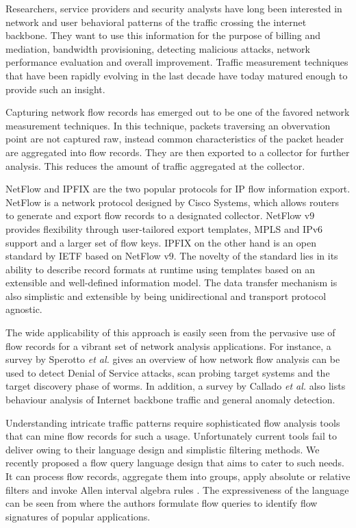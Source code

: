 Researchers, service providers and security analysts have long been interested
in network and user behavioral patterns of the traffic crossing the internet
backbone. They want to use this information for the purpose of billing and
mediation, bandwidth provisioning, detecting malicious attacks, network
performance evaluation and overall improvement. Traffic measurement techniques
that have been rapidly evolving in the last decade have today matured enough
to provide such an insight.

Capturing network flow records has emerged out to be one of the favored
network measurement techniques. In this technique, packets traversing an
obvervation point are not captured raw, instead common characteristics of the
packet header are aggregated into flow records. They are then exported to a
collector for further analysis.  This reduces the amount of traffic aggregated
at the collector.

NetFlow and \ac{IPFIX} are the two popular protocols for IP flow information
export. NetFlow \cite{rfc3954} is a network protocol designed by Cisco
Systems, which allows routers to generate and export flow records to a
designated collector. NetFlow v$9$ provides flexibility through user-tailored
export templates, \ac{MPLS} and IPv$6$ support and a larger set of flow keys.
\ac{IPFIX} \cite{rfc5101} on the other hand is an open standard by IETF based
on NetFlow v$9$. The novelty of the standard lies in its ability to describe
record formats at runtime using templates based on an extensible and
well-defined information model. The data transfer mechanism is also simplistic
and extensible by being unidirectional and transport protocol agnostic.

The wide applicability of this approach is easily seen from the pervasive use
of flow records for a vibrant set of network analysis applications. For
instance, a survey by Sperotto \textit{et al.} \cite{sperotto:2010} gives an
overview of how network flow analysis can be used to detect Denial of Service
attacks, scan probing target systems and the target discovery phase of worms.
In addition, a survey by Callado \textit{et al.} \cite{callado:2009} also
lists behaviour analysis of Internet backbone traffic and general anomaly
detection.

Understanding intricate traffic patterns require sophisticated flow analysis
tools that can mine flow records for such a usage.  Unfortunately current
tools fail to deliver owing to their language design and simplistic filtering
methods.  We recently proposed a flow query language design
\cite{vmarinov:2009} that aims to cater to such needs.  It can process
flow records, aggregate them into groups, apply absolute or relative filters
and invoke Allen interval algebra rules \cite{fallen:1983}. The expressiveness
of the language can be seen from \cite{vperelman:2011} where the authors
formulate flow queries to identify flow signatures of popular applications.

